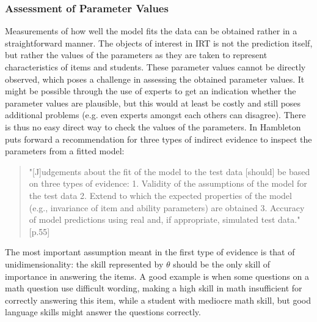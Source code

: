 \documentclass{scrartcl}
\begin{document}

\subsubsection{Assessment of Parameter Values}
\label{sec:asses}
Measurements of how well the model fits the data can be obtained rather in a straightforward manner. The objects of interest in IRT is not the prediction itself, but rather the values of the parameters as they are taken to represent characteristics of items and students. These parameter values cannot be directly observed, which poses a challenge in assessing the obtained parameter values. It might be possible through the use of experts to get an indication whether the parameter values are plausible, but this would at least be costly and still poses additional problems (e.g. even experts amongst each others can disagree). There is thus no easy direct way to check the values of the parameters. In \cite{hambleton} Hambleton puts forward a recommendation for three types of indirect evidence to inspect the parameters from a fitted model:

\begin{quote}"[J]udgements about the fit of the model to the test data [should] be based on three types of evidence: 1. Validity of the assumptions of the model for the test data 2. Extend to which the expected properties of the model (e.g., invariance of item and ability parameters) are obtained 3. Accuracy of model predictions using real and, if appropriate, simulated test data."[p.55]
\end{quote}

 The most important assumption meant in the first type of evidence is that of unidimensionality: the skill represented by $\theta$ should be the only skill of importance in answering the items. A good example is when some questions on a math question use difficult wording, making a high skill in math insufficient for correctly answering this item, while a student with mediocre math skill, but good language skills might answer the questions correctly. 
\end{document}
